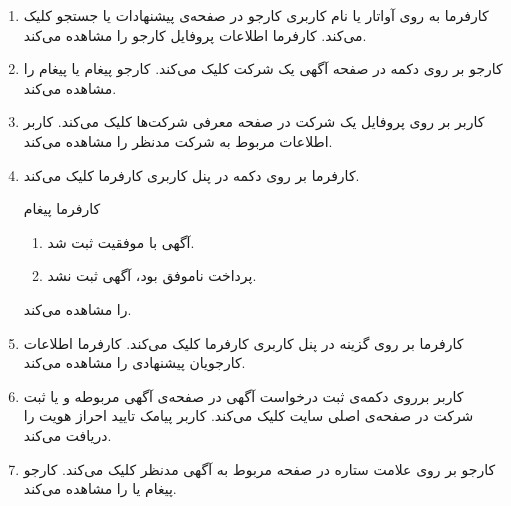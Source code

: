 \begin{enumerate}
	\item[] 
	\tuc				
	{کارفرما به روی آواتار یا نام کاربری کارجو در صفحه‌ی پیشنهادات یا جستجو کلیک می‌کند.}				
	{کارفرما اطلاعات پروفایل کارجو را مشاهده می‌کند.}
	
	\item[] \label{uc:resume}
	\tuc				
	{کارجو بر روی دکمه  در صفحه آگهی یک شرکت کلیک می‌کند.}
	{کارجو پیغام  یا پیغام  را مشاهده می‌کند.}
	
	\item[] \label{uc:company-profile}
	\tuc				
	{کاربر بر روی پروفایل یک شرکت در صفحه معرفی شرکت‌ها کلیک می‌کند.}				
	{کاربر اطلاعات مربوط به شرکت مدنظر را مشاهده می‌کند.}
	\renewcommand{\labelenumi}{\alph{enumi})}
	
	\item[] 
	\tuc
	{کارفرما بر روی دکمه  در پنل کاربری کارفرما کلیک می‌کند.}
	{کارفرما پیغام 
		\begin{enumerate}
			\item 
			آگهی با موفقیت ثبت شد.
			\item 
			پرداخت ناموفق بود، آگهی ثبت نشد.
		\end{enumerate} را مشاهده می‌کند.}
	\renewcommand{\labelenumi}{\arabic{enumi})}
	
	\item[] 
	\tuc
	{کارفرما بر روی گزینه  در پنل کاربری کارفرما کلیک می‌کند.}
	{کارفرما اطلاعات کارجویان پیشنهادی را مشاهده می‌کند.}
	
	\item[] 
	\tuc				
	{کاربر برروی دکمه‌ی ثبت درخواست آگهی در صفحه‌ی آگهی مربوطه و یا ثبت شرکت در صفحه‌ی اصلی سایت کلیک می‌کند.}			
	{کاربر پیامک تایید احراز هویت را دریافت می‌کند.}
	
	\item[] \label{uc:bookmark}
	\tuc
	{کارجو بر روی علامت ستاره در صفحه مربوط به آگهی مدنظر کلیک می‌کند.}
	{کارجو پیغام  یا  را مشاهده می‌کند.}
	

\end{enumerate}
